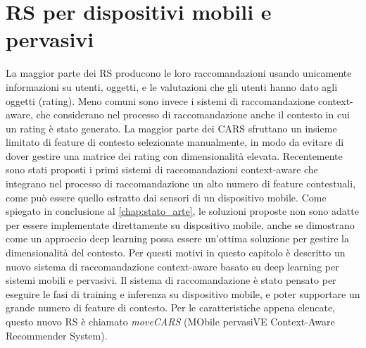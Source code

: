 \documentclass[12pt,italian]{report}
\begin{document}
% 
% 

\chapter{RS per dispositivi mobili e pervasivi}
\label{chap:classificatore}
La maggior parte dei RS producono le loro raccomandazioni usando unicamente informazioni su utenti, oggetti, e le valutazioni che gli utenti hanno dato agli oggetti (rating). Meno comuni sono invece i sistemi di raccomandazione context-aware, che considerano nel processo di raccomandazione anche il contesto in cui un rating è stato generato. La maggior parte dei CARS sfruttano un insieme limitato di feature di contesto selezionate manualmente, in modo da evitare di dover gestire una matrice dei rating con dimensionalità elevata. Recentemente sono stati proposti i primi sistemi di raccomandazioni context-aware che integrano nel processo di raccomandazione un alto numero di feature contestuali, come può essere quello estratto dai sensori di un dispositivo mobile. Come spiegato in conclusione al \autoref{chap:stato_arte}, le soluzioni proposte non sono adatte per essere implementate direttamente su dispositivo mobile, anche se dimostrano come un approccio deep learning possa essere un'ottima soluzione per gestire la dimensionalità del contesto. Per questi motivi in questo capitolo è descritto un nuovo sistema di raccomandazione context-aware basato su deep learning per sistemi mobili e pervasivi. Il sistema di raccomandazione è stato pensato per eseguire le fasi di training e inferenza su dispositivo mobile, e poter supportare un grande numero di feature di contesto. Per le caratteristiche appena elencate, questo nuovo RS è chiamato \textit{moveCARS} (MObile pervasiVE Context-Aware Recommender System).
\end{document}
